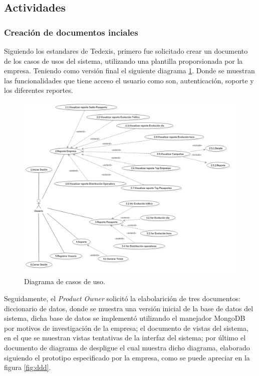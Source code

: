 \subsection{Actividades}

\subsubsection{Creación de documentos inciales}
\indent Siguiendo los estandares de Tedexis, primero fue solicitado crear un documento de los casos de usos del sistema, utilizando una plantilla proporsionada por la empresa. Teniendo como versión final el siguiente diagrama \ref{fig:cdu}. Donde se muestran las funcionalidades que tiene acceso el usuario como son, autenticación, soporte y los diferentes reportes.
\pagebreak
\begin{figure}[ht]
  \centering
  \includegraphics[scale=0.42,type=png,ext=.png,read=.png]{imagenes/cdu}
  \caption{Diagrama de casos de uso.}
  \label{fig:cdu}
\end{figure}
\newline
\newline
\indent Seguidamente, el \textit{Product Owner} solicitó la elabolarición de tres documentos: diccionario de datos, donde se muestra una versión inicial de la base de datos del sistema, dicha base de datos se implementó utilizando el manejador MongoDB por motivos de investigación de la empresa; el documento de vistas del sistema, en el que se muestran vistas tentativas de la interfaz del sistema; por último el documento de diagrama de despligue el cual muestra dicho diagrama, elaborado siguiendo el prototipo especificado por la empresa, como se puede apreciar en la figura \ref{fig:ddd}. 
